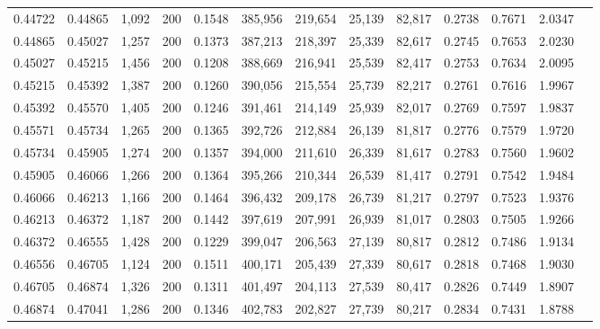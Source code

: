 \begin{tabular}{rrrrrrrrrrrrr}
0.44722 & 0.44865 &  1,092 & 200 &                                     0.1548 & 385,956 & 219,654 &  25,139 &  82,817 & 0.2738 & 0.7671 & 2.0347 \\
0.44865 & 0.45027 &  1,257 & 200 &                                     0.1373 & 387,213 & 218,397 &  25,339 &  82,617 & 0.2745 & 0.7653 & 2.0230 \\
0.45027 & 0.45215 &  1,456 & 200 &                                     0.1208 & 388,669 & 216,941 &  25,539 &  82,417 & 0.2753 & 0.7634 & 2.0095 \\
0.45215 & 0.45392 &  1,387 & 200 &                                     0.1260 & 390,056 & 215,554 &  25,739 &  82,217 & 0.2761 & 0.7616 & 1.9967 \\
0.45392 & 0.45570 &  1,405 & 200 &                                     0.1246 & 391,461 & 214,149 &  25,939 &  82,017 & 0.2769 & 0.7597 & 1.9837 \\
0.45571 & 0.45734 &  1,265 & 200 &                                     0.1365 & 392,726 & 212,884 &  26,139 &  81,817 & 0.2776 & 0.7579 & 1.9720 \\
0.45734 & 0.45905 &  1,274 & 200 &                                     0.1357 & 394,000 & 211,610 &  26,339 &  81,617 & 0.2783 & 0.7560 & 1.9602 \\
0.45905 & 0.46066 &  1,266 & 200 &                                     0.1364 & 395,266 & 210,344 &  26,539 &  81,417 & 0.2791 & 0.7542 & 1.9484 \\
0.46066 & 0.46213 &  1,166 & 200 &                                     0.1464 & 396,432 & 209,178 &  26,739 &  81,217 & 0.2797 & 0.7523 & 1.9376 \\
0.46213 & 0.46372 &  1,187 & 200 &                                     0.1442 & 397,619 & 207,991 &  26,939 &  81,017 & 0.2803 & 0.7505 & 1.9266 \\
0.46372 & 0.46555 &  1,428 & 200 &                                     0.1229 & 399,047 & 206,563 &  27,139 &  80,817 & 0.2812 & 0.7486 & 1.9134 \\
0.46556 & 0.46705 &  1,124 & 200 &                                     0.1511 & 400,171 & 205,439 &  27,339 &  80,617 & 0.2818 & 0.7468 & 1.9030 \\
0.46705 & 0.46874 &  1,326 & 200 &                                     0.1311 & 401,497 & 204,113 &  27,539 &  80,417 & 0.2826 & 0.7449 & 1.8907 \\
0.46874 & 0.47041 &  1,286 & 200 &                                     0.1346 & 402,783 & 202,827 &  27,739 &  80,217 & 0.2834 & 0.7431 & 1.8788 \\

\end{tabular}
